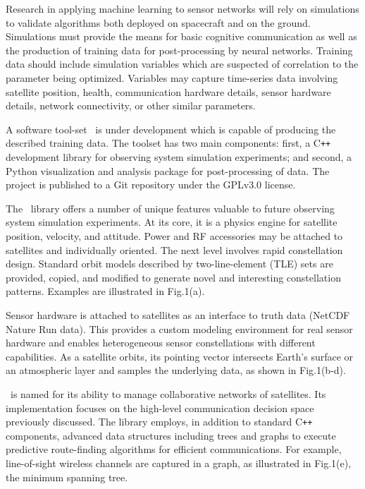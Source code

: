 \documentclass[conference]{IEEEtran}
\newcommand{\project}{{\sc{Collaborate}}~}
\newcommand{\cpp}{C\texttt{++}~}
\begin{document}
Research in applying machine learning to sensor networks will rely on
simulations to validate algorithms both deployed on spacecraft and on the
ground.  Simulations must provide the means for basic cognitive communication as
well as the production of training data for post-processing by neural networks.
Training data should include simulation variables which are suspected of
correlation to the parameter being optimized.  Variables may capture time-series
data involving satellite position, health, communication hardware details,
sensor hardware details, network connectivity, or other similar parameters.

A software tool-set \project is under development which is capable of producing
the described training data.  The toolset has two main components: first, a \cpp
development library for observing system simulation experiments; and second, a
Python visualization and analysis package for post-processing of data.  The
project is published to a Git repository under the GPLv3.0 license.

The \project library offers a number of unique features valuable to future
observing system simulation experiments.  At its core, it is a physics engine
for satellite position, velocity, and attitude.  Power and RF accessories may be
attached to satellites and individually oriented.  The next level involves rapid
constellation design.  Standard orbit models described by two-line-element (TLE)
sets are provided, copied, and modified to generate novel and interesting
constellation patterns.  Examples are illustrated in Fig.1(a).

Sensor hardware is attached to satellites as an interface to truth data (NetCDF
Nature Run data).  This provides a custom modeling environment for real sensor
hardware and enables heterogeneous sensor constellations with different
capabilities.  As a satellite orbits, its pointing vector intersects Earth's
surface or an atmospheric layer and samples the underlying data, as shown in
Fig.1(b-d).

\project is named for its ability to manage collaborative networks of
satellites.  Its implementation focuses on the high-level communication decision
space previously discussed.  The library employs, in addition to standard \cpp
components, advanced data structures including trees and graphs to execute
predictive route-finding algorithms for efficient communications.  For example,
line-of-sight wireless channels are captured in a graph, as illustrated in
Fig.1(e), the minimum spanning tree.
\end{document}
